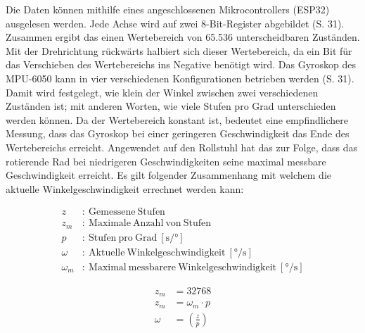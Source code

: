 Die Daten können mithilfe eines angeschlossenen Mikrocontrollers (ESP32) ausgelesen werden.
Jede Achse wird auf zwei 8-Bit-Register abgebildet (S. 31)\cite{invensenseinc.MPU6000MPU6050Register2013}.
Zusammen ergibt das einen Wertebereich von 65.536 unterscheidbaren Zuständen.
Mit der Drehrichtung rückwärts halbiert sich dieser Wertebereich, da ein Bit für das Verschieben des Wertebereichs ins Negative benötigt wird.
Das Gyroskop des MPU-6050 kann in vier verschiedenen Konfigurationen betrieben werden (S. 31)\cite{invensenseinc.MPU6000MPU6050Register2013}.
Damit wird festgelegt, wie klein der Winkel zwischen zwei verschiedenen Zuständen ist; mit anderen Worten, wie viele Stufen pro Grad unterschieden werden können.
Da der Wertebereich konstant ist, bedeutet eine empfindlichere Messung, dass das Gyroskop bei einer geringeren Geschwindigkeit das Ende des Wertebereichs erreicht.
Angewendet auf den Rollstuhl hat das zur Folge, dass das rotierende Rad bei niedrigeren Geschwindigkeiten seine maximal messbare Geschwindigkeit erreicht.
Es gilt folgender Zusammenhang mit welchem die aktuelle Winkelgeschwindigkeit errechnet werden kann:

\begin{align}
    z        & : \ \mathrm{Gemessene\ Stufen}                                                  \\
    z_m      & : \ \mathrm{Maximale\ Anzahl\ von\ Stufen}                                      \\
    p        & : \ \mathrm{Stufen\ pro\ Grad}\ [\si{\second/\degree}]                          \\
    \omega   & : \ \mathrm{Aktuelle\ Winkelgeschwindigkeit}\ [\si{\degree/\second}]            \\
    \omega_m & : \ \mathrm{Maximal\ messbarere\ Winkelgeschwindigkeit}\ [\si{\degree/\second}]
\end{align}

\begin{align}
    z_m    & = 32768                      \\
    z_m    & = \omega_m \cdot p           \\
    \omega & = \left(\frac {z} {p}\right)
\end{align}

